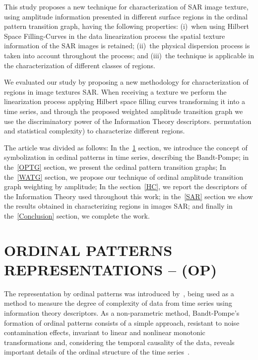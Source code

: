 \documentclass{isprs}
\begin{document}
	This study proposes a new technique for characterization of SAR image texture, using amplitude information presented in different surface regions in the ordinal pattern transition graph, having the following properties:
	(i)~when using Hilbert Space Filling-Curves in the data linearization process the spatial texture information of the SAR images is retained;
	(ii)~the physical dispersion process is taken into account throughout the process; and
	(iii)~the technique is applicable in the characterization of different classes of regions.
	
	We evaluated our study by proposing a new methodology for characterization of regions in image textures SAR.
	When receiving a texture we perform the linearization process applying Hilbert space filling curves transforming it into a time series, and through the proposed weighted amplitude transition graph we use the discriminatory power of the Information Theory descriptors. permutation and statistical complexity) to characterize different regions.
	
	The article was divided as follows:
	In the~\ref{OP} section, we introduce the concept of symbolization in ordinal patterns in time series, describing the Bandt-Pompe;
	in the~\ref{OPTG} section, we present the ordinal pattern transition graphs;
	In the~\ref{WATG} section, we propose our technique of ordinal amplitude transition graph weighting by amplitude;
	In the section~\ref{HC}, we report the descriptors of the Information Theory used throughout this work;
	in the~\ref{SAR} section we show the results obtained in characterizing regions in images SAR;
	and finally in the~\ref{Conclusion} section, we complete the work.
	
	\section{ORDINAL PATTERNS REPRESENTATIONS -- (OP)}\label{OP}
	
	The representation by ordinal patterns was introduced by~\cite{Bandt2002Permutation}, being used as a method to measure the degree of complexity of data from time series using information theory descriptors.
	As a non-parametric method, Bandt-Pompe's formation of ordinal patterns consists of a simple approach, resistant to noise contamination effects, invariant to linear and nonlinear monotonic transformations and, considering the temporal causality of the data, reveals important details of the ordinal structure of the time series~\citep{Larrondo2006Random}.
	
\end{document}
